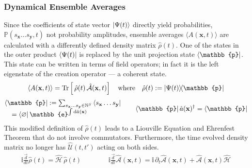 \documentclass{article}[12pt]
\numberwithin{equation}{section}
\begin{document}
\subsubsection{Dynamical Ensemble Averages}\vspace{-10pt}
Since the coefficients of state vector $\ket{\Psi(t)}$ directly yield probabilities,
$\mathbb{P}(s_{\mathbf{x}}\dots s_{\mathbf{y}},t)$ not probability amplitudes, ensemble
averages $\langle A(\mathbf{x},t)\rangle$ are calculated with a differently defined
density matrix $\hat\rho(t)$. One of the states in the outer product $\bra{\Psi(t)}$
is replaced by the unit projection state $\bra{\mathbb{p}}$. This state can be written
in terms of field operators; in fact it is the left eigenstate of the creation operator
--- a coherent state.
\begin{align}
	\left\langle A(\mathbf{x},t) \right\rangle=
	\text{Tr}\left[
	\,\hat\rho(t)\,\hat{\mathcal{A}}(\mathbf{x},t)
	\right]
	\quad\text{where}\quad\hat\rho(t):=\ket{\Psi(t)}\!\!\bra{\mathbb{p}}
	\label{eq:averages}
\end{align}
\vspace{-35pt}
\begin{align}
	\begin{matrix}
		\bra{\mathbb{p}}:=
		\sum_{s_{\mathbf{x}}\dots s_{\mathbf{y}}\in\mathbb{N}^S}
		\bra{s_{\mathbf{x}}\dots s_{\mathbf{y}}} \\
		=\bra{\varnothing}\mathbb{e}^{\int\mathrm{d}\hat a(\mathbf{x})}
		\qquad\qquad
	\end{matrix}
	\qquad\bra{\mathbb{p}}\hat{a}(\mathbf{x})^{\dagger}=\bra{\mathbb{p}}
	\label{eq:projectionoperator}
\end{align}
This modified definition of $\hat\rho(t)$ leads to a Liouville Equation and
Ehrenfest Theorem that do not involve commutators. Furthermore, the time
evolved density matrix no longer has $\hat{\mathcal{U}}(t,t')$ acting on
both sides.
\begin{align}\label{eq:liouville-ehrenfest}
\mathbb{i}\frac{\overrightarrow{d}}{dt}\hat\rho(t)=\hat{\mathcal{H}}\,\hat\rho(t)
\qquad\qquad
\mathbb{i}\frac{\overrightarrow{d}}{dt}\hat{\mathcal{A}}(\mathbf{x},t)
=\mathbb{i}
\,\partial_t\hat{\mathcal{A}}(\mathbf{x},t)
+\hat{\mathcal{A}}(\mathbf{x},t)\hat{\mathcal{H}}
\end{align}\vspace{-30pt}
\end{document}
